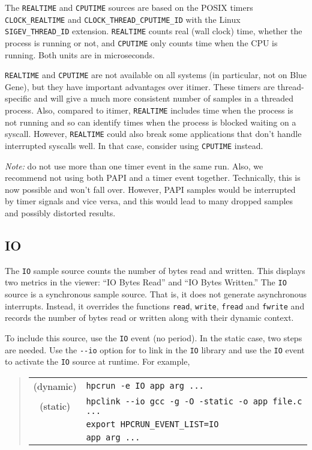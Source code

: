 The \verb|REALTIME| and \verb|CPUTIME| sources are based on the POSIX
timers \verb|CLOCK_REALTIME| and \verb|CLOCK_THREAD_CPUTIME_ID| with
the Linux \verb|SIGEV_THREAD_ID| extension.  \verb|REALTIME| counts
real (wall clock) time, whether the process is running or not, and
\verb|CPUTIME| only counts time when the CPU is running.  Both units
are in microseconds.

\verb|REALTIME| and \verb|CPUTIME| are not available on all systems
(in particular, not on Blue Gene), but they have important advantages
over itimer.  These timers are thread-specific and will give a much
more consistent number of samples in a threaded process.  Also,
compared to itimer, \verb|REALTIME| includes time when the process is
not running and so can identify times when the process is blocked
waiting on a syscall.  However, \verb|REALTIME| could also break some
applications that don't handle interrupted syscalls well.  In that
case, consider using \verb|CPUTIME| instead.

{\it Note:} do not use more than one timer event in the same run.
Also, we recommend not using both PAPI and a timer event together.
Technically, this is now possible and \hpcrun{} won't fall over.
However, PAPI samples would be interrupted by timer signals and vice
versa, and this would lead to many dropped samples and possibly
distorted results.

\subsection{IO}

The \verb|IO| sample source counts the number of bytes read and
written.  This displays two metrics in the viewer: ``IO Bytes Read''
and ``IO Bytes Written.''  The \verb|IO| source is a synchronous sample
source.  That is, it does not generate asynchronous interrupts.
Instead, it overrides the functions \verb|read|, \verb|write|, \verb|fread|
and \verb|fwrite| and records the number of bytes read or
written along with their dynamic context.

To include this source, use the \verb|IO| event (no period).  In the
static case, two steps are needed.  Use the \verb|--io| option for
\hpclink{} to link in the \verb|IO| library and use the \verb|IO| event
to activate the \verb|IO| source at runtime.  For example,

\begin{quote}
\begin{tabular}{@{}cl}
(dynamic) & \verb|hpcrun -e IO app arg ...| \\
(static)  & \verb|hpclink --io gcc -g -O -static -o app file.c ...| \\
& \verb|export HPCRUN_EVENT_LIST=IO| \\
& \verb|app arg ...|
\end{tabular}
\end{quote}

